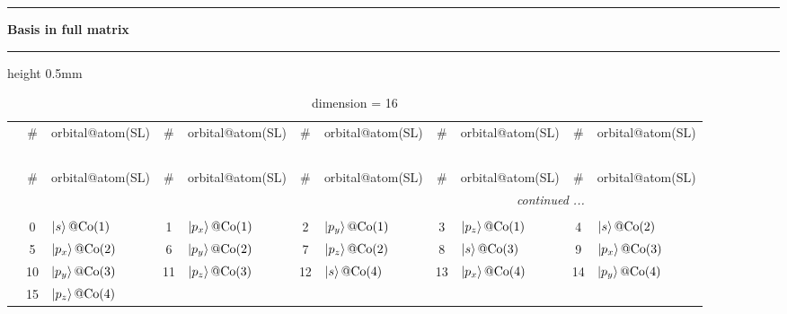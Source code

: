 \documentclass[fleqn,10pt,landscape]{jsarticle}
\begin{document}
\vspace{5mm}
\noindent \rule[0.5mm]{5mm}{0.5mm}\hspace{3mm}\textbf{Basis in full matrix}\hspace{3mm}\leaders\hrule height 0.5mm\hfill\kern0pt
\vspace{3mm}

\renewcommand{\arraystretch}{1.6}
\begin{longtable}[l]{c|cl|cl|cl|cl|cl}
\captionsetup{justification=raggedright, singlelinecheck=off}
\caption{dimension = 16}
 \\
 \hline \hline
 & \# & orbital@atom(SL) & \# & orbital@atom(SL) & \# & orbital@atom(SL) & \# & orbital@atom(SL) & \# & orbital@atom(SL) \\ \hline \endfirsthead

\multicolumn{10}{l}{\tablename\ \thetable{}} \\
 \hline \hline
 & \# & orbital@atom(SL) & \# & orbital@atom(SL) & \# & orbital@atom(SL) & \# & orbital@atom(SL) & \# & orbital@atom(SL) \\ \hline \endhead

 \hline \hline
\multicolumn{10}{r}{\footnotesize\it continued ...} \\ \endfoot

 \hline \hline
\multicolumn{10}{r}{} \\ \endlastfoot

 & 0 & $\ket{s}@{\rm Co}(1)$ & 1 & $\ket{p_{x}}@{\rm Co}(1)$ & 2 & $\ket{p_{y}}@{\rm Co}(1)$ & 3 & $\ket{p_{z}}@{\rm Co}(1)$ & 4 & $\ket{s}@{\rm Co}(2)$ \\
& 5 & $\ket{p_{x}}@{\rm Co}(2)$ & 6 & $\ket{p_{y}}@{\rm Co}(2)$ & 7 & $\ket{p_{z}}@{\rm Co}(2)$ & 8 & $\ket{s}@{\rm Co}(3)$ & 9 & $\ket{p_{x}}@{\rm Co}(3)$ \\
& 10 & $\ket{p_{y}}@{\rm Co}(3)$ & 11 & $\ket{p_{z}}@{\rm Co}(3)$ & 12 & $\ket{s}@{\rm Co}(4)$ & 13 & $\ket{p_{x}}@{\rm Co}(4)$ & 14 & $\ket{p_{y}}@{\rm Co}(4)$ \\
& 15 & $\ket{p_{z}}@{\rm Co}(4)$ &  &  &  &  &  &  &  &  \\
\end{longtable}
\renewcommand{\arraystretch}{1.6}
\end{document}
